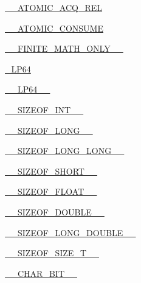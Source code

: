 \begin{DoxyCompactItemize}
\item 
\hyperlink{cmake-build-release_2CMakeCache_8txt_a93654874cdfb30676f9c0c31eb3511c0}{\+\_\+\+\_\+\+A\+T\+O\+M\+I\+C\+\_\+\+A\+C\+Q\+\_\+\+R\+EL}
\item 
\hyperlink{cmake-build-release_2CMakeCache_8txt_a000e85470c6f5d9f1aa22fa4df83f0b9}{\+\_\+\+\_\+\+A\+T\+O\+M\+I\+C\+\_\+\+C\+O\+N\+S\+U\+ME}
\item 
\hyperlink{cmake-build-release_2CMakeCache_8txt_a8af0fd31855c1121674e7d0adf6acbee}{\+\_\+\+\_\+\+F\+I\+N\+I\+T\+E\+\_\+\+M\+A\+T\+H\+\_\+\+O\+N\+L\+Y\+\_\+\+\_\+}
\item 
\hyperlink{cmake-build-release_2CMakeCache_8txt_aae88ee59a31703e88a326390e91a32fd}{\+\_\+\+L\+P64}
\item 
\hyperlink{cmake-build-release_2CMakeCache_8txt_a2dcb516e6c55b8bdfd122dc65ada57b5}{\+\_\+\+\_\+\+L\+P64\+\_\+\+\_\+}
\item 
\hyperlink{cmake-build-release_2CMakeCache_8txt_a52701f18fd19d3d5e1f83ec11c05d570}{\+\_\+\+\_\+\+S\+I\+Z\+E\+O\+F\+\_\+\+I\+N\+T\+\_\+\+\_\+}
\item 
\hyperlink{cmake-build-release_2CMakeCache_8txt_a25b323872510a2d005ee2f45f5efd38b}{\+\_\+\+\_\+\+S\+I\+Z\+E\+O\+F\+\_\+\+L\+O\+N\+G\+\_\+\+\_\+}
\item 
\hyperlink{cmake-build-release_2CMakeCache_8txt_a87bd59f7da0f977c3d450e95b4f00532}{\+\_\+\+\_\+\+S\+I\+Z\+E\+O\+F\+\_\+\+L\+O\+N\+G\+\_\+\+L\+O\+N\+G\+\_\+\+\_\+}
\item 
\hyperlink{cmake-build-release_2CMakeCache_8txt_a13a1a9ce0eb7429c078ea705b54ac44d}{\+\_\+\+\_\+\+S\+I\+Z\+E\+O\+F\+\_\+\+S\+H\+O\+R\+T\+\_\+\+\_\+}
\item 
\hyperlink{cmake-build-release_2CMakeCache_8txt_a99451faa2465beb743c5cadc6a20f102}{\+\_\+\+\_\+\+S\+I\+Z\+E\+O\+F\+\_\+\+F\+L\+O\+A\+T\+\_\+\+\_\+}
\item 
\hyperlink{cmake-build-release_2CMakeCache_8txt_acb4d0f0ad8b370190fb78d60045cbe85}{\+\_\+\+\_\+\+S\+I\+Z\+E\+O\+F\+\_\+\+D\+O\+U\+B\+L\+E\+\_\+\+\_\+}
\item 
\hyperlink{cmake-build-release_2CMakeCache_8txt_a398170fb1a6ec5ddef97aada19630f92}{\+\_\+\+\_\+\+S\+I\+Z\+E\+O\+F\+\_\+\+L\+O\+N\+G\+\_\+\+D\+O\+U\+B\+L\+E\+\_\+\+\_\+}
\item 
\hyperlink{cmake-build-release_2CMakeCache_8txt_a8a0ccc607658039e8f34c766290b880a}{\+\_\+\+\_\+\+S\+I\+Z\+E\+O\+F\+\_\+\+S\+I\+Z\+E\+\_\+\+T\+\_\+\+\_\+}
\item 
\hyperlink{cmake-build-release_2CMakeCache_8txt_af18faf2347e6868d6c9ed02b46326720}{\+\_\+\+\_\+\+C\+H\+A\+R\+\_\+\+B\+I\+T\+\_\+\+\_\+}

\end{DoxyCompactItemize}
